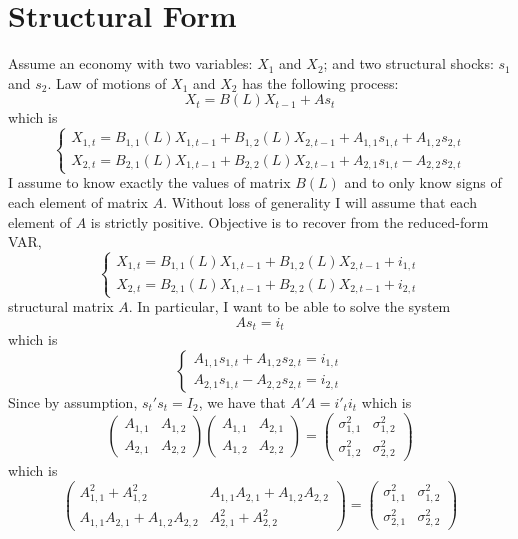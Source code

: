 \documentclass[14pt]{article}
\begin{document}
\section*{Structural Form}

Assume an economy with two variables: $X_1$ and $X_2$; and two structural shocks: $s_1$ and $s_2$. Law of motions of $X_1$ and $X_2$ has the following process:
$$
X_t = B(L)X_{t-1} + As_t
$$
which is
$$
\begin{cases}
X_{1,t} = B_{1,1}(L)X_{1,t-1} + B_{1,2}(L)X_{2,t-1} + A_{1,1}s_{1,t} + A_{1,2}s_{2,t} \\
X_{2,t} = B_{2,1}(L)X_{1,t-1} + B_{2,2}(L)X_{2,t-1} + A_{2,1}s_{1,t} - A_{2,2}s_{2,t}
\end{cases}
$$
I assume to know exactly the values of matrix $B(L)$ and to only know signs of each element of matrix $A$. Without loss of generality I will assume that each element of $A$ is strictly positive. Objective is to recover from the reduced-form VAR,
$$
\begin{cases}
X_{1,t} = B_{1,1}(L)X_{1,t-1} + B_{1,2}(L)X_{2,t-1} + i_{1,t} \\
X_{2,t} = B_{2,1}(L)X_{1,t-1} + B_{2,2}(L)X_{2,t-1} + i_{2,t}
\end{cases}
$$
structural matrix $A$. In particular, I want to be able to solve the system
$$
As_t = i_t
$$
which is
$$
\begin{cases}
A_{1,1}s_{1,t} + A_{1,2}s_{2,t} = i_{1,t} \\
A_{2,1}s_{1,t} - A_{2,2}s_{2,t} = i_{2,t}
\end{cases}
$$
Since by assumption, $s_t's_t = I_2$, we have that $A'A = i'_t i_t$ which is
$$
\begin{pmatrix}
A_{1,1} & A_{1,2} \\
A_{2,1} & A_{2,2}
\end{pmatrix} \begin{pmatrix}
A_{1,1} & A_{2,1} \\
A_{1,2} & A_{2,2}
\end{pmatrix}  = \begin{pmatrix}
\sigma^2_{1,1} & \sigma^2_{1,2} \\
\sigma^2_{1,2} & \sigma^2_{2,2}
\end{pmatrix}
$$
which is
$$
\begin{pmatrix}
A_{1,1}^2 + A_{1,2}^2 & A_{1,1} A_{2,1} + A_{1,2} A_{2,2}  \\
A_{1,1} A_{2,1} + A_{1,2} A_{2,2}  & A_{2,1}^2 + A_{2,2}^2
\end{pmatrix} = \begin{pmatrix}
\sigma^2_{1,1} & \sigma^2_{1,2} \\
\sigma^2_{2,1} & \sigma^2_{2,2}
\end{pmatrix}
$$
\end{document}

